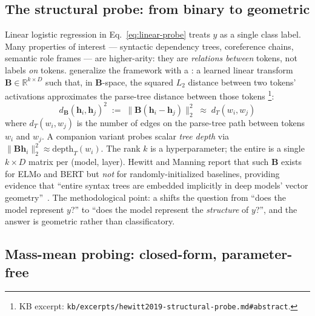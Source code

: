 \subsection{The structural probe: from binary to geometric}
\label{sec:structural-probe}

Linear logistic regression in Eq.~\eqref{eq:linear-probe} treats $y$ as a
single class label. Many properties of interest — syntactic dependency
trees, coreference chains, semantic role frames — are higher-arity:
they are \emph{relations between} tokens, not labels \emph{on} tokens.
\citet{hewitt2019-structural-probe} generalize the framework with a
\emph{}: a learned linear transform
$\mathbf{B} \in \mathbb{R}^{k \times D}$ such that, in $\mathbf{B}$-space,
the squared $L_2$ distance between two tokens' activations approximates
the parse-tree distance between those tokens
\citep{hewitt2019-structural-probe}\footnote{KB excerpt:
\nolinkurl{kb/excerpts/hewitt2019-structural-probe.md#abstract}.}:
\begin{equation}
  \boxed{\;
  d_{\mathbf{B}}(\mathbf{h}_i, \mathbf{h}_j)^2
  \;:=\; \|\mathbf{B}(\mathbf{h}_i - \mathbf{h}_j)\|_2^2
  \;\approx\; d_T(w_i, w_j)
  \;}
  \label{eq:structural-probe}
\end{equation}
where $d_T(w_i, w_j)$ is the number of edges on the parse-tree path
between tokens $w_i$ and $w_j$. A companion variant probes scalar
\emph{tree depth} via $\|\mathbf{B}\mathbf{h}_i\|_2^2 \approx
\mathrm{depth}_T(w_i)$. The rank $k$ is a hyperparameter; the entire
 is a single $k \times D$ matrix per (model, layer). Hewitt and
Manning report that such $\mathbf{B}$ exists for ELMo and BERT but
\emph{not} for randomly-initialized baselines, providing evidence that
``entire syntax trees are embedded implicitly in deep models' vector
geometry''~\citep{hewitt2019-structural-probe}. The methodological
point: a  shifts the question from ``does the model
represent $y$?'' to ``does the model represent the \emph{structure} of
$y$?'', and the answer is geometric rather than classificatory.

\subsection{Mass-mean probing: closed-form, parameter-free}
\label{sec:mass-mean}

